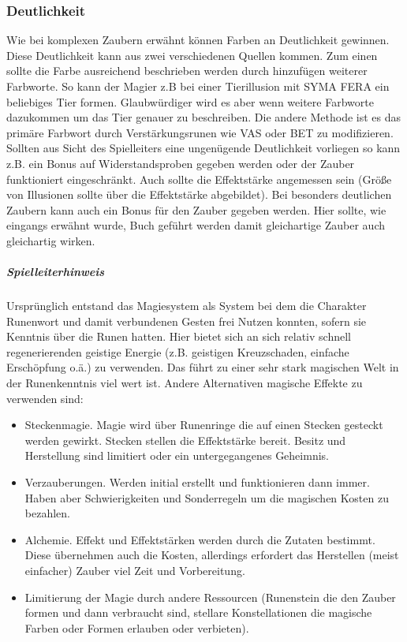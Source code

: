 \documentclass{article}
\begin{document}
\subsubsection{Deutlichkeit}

Wie bei komplexen Zaubern erwähnt können Farben an Deutlichkeit gewinnen. Diese Deutlichkeit kann aus zwei verschiedenen
Quellen kommen. Zum einen sollte die Farbe ausreichend beschrieben werden durch hinzufügen weiterer Farbworte.
So kann der Magier z.B bei einer Tierillusion mit SYMA FERA ein beliebiges Tier formen. Glaubwürdiger wird es aber
wenn weitere Farbworte dazukommen um das Tier genauer zu beschreiben. Die andere Methode ist es das primäre Farbwort
durch Verstärkungsrunen wie VAS oder BET zu modifizieren. Sollten aus Sicht des Spielleiters eine ungenügende
Deutlichkeit vorliegen so kann z.B. ein Bonus auf Widerstandsproben gegeben werden oder der Zauber funktioniert
eingeschränkt. Auch sollte die Effektstärke angemessen sein (Größe von Illusionen sollte über die Effektstärke
abgebildet). Bei besonders deutlichen Zaubern kann auch ein Bonus für den Zauber gegeben werden. Hier sollte, wie
eingangs erwähnt wurde, Buch geführt werden damit gleichartige Zauber auch gleichartig wirken.

\begin{mdframed}[hidealllines=true, backgroundcolor=black!10]
\subparagraph{Spielleiterhinweis}

Ursprünglich entstand das Magiesystem als System bei dem die Charakter Runenwort und damit verbundenen Gesten frei
Nutzen konnten, sofern sie Kenntnis über die Runen hatten. Hier bietet sich an sich relativ schnell regenerierenden
geistige Energie (z.B. geistigen Kreuzschaden, einfache Erschöpfung o.ä.) zu verwenden. Das führt zu einer sehr
stark magischen Welt in der Runenkenntnis viel wert ist. Andere Alternativen magische Effekte zu verwenden sind:

\begin{itemize}
\item Steckenmagie. Magie wird über Runenringe die auf einen Stecken gesteckt werden gewirkt. Stecken stellen die Effektstärke bereit. Besitz und Herstellung sind limitiert oder ein untergegangenes Geheimnis.
\item Verzauberungen. Werden initial erstellt und funktionieren dann immer. Haben aber Schwierigkeiten und Sonderregeln um die magischen Kosten zu bezahlen.
\item Alchemie. Effekt und Effektstärken werden durch die Zutaten bestimmt. Diese übernehmen auch die Kosten, allerdings erfordert das Herstellen (meist einfacher) Zauber viel Zeit und Vorbereitung.
\item Limitierung der Magie durch andere Ressourcen (Runenstein die den Zauber formen und dann verbraucht sind, stellare Konstellationen die magische Farben oder Formen erlauben oder verbieten).
\end{itemize}

\end{mdframed}
\end{document}
